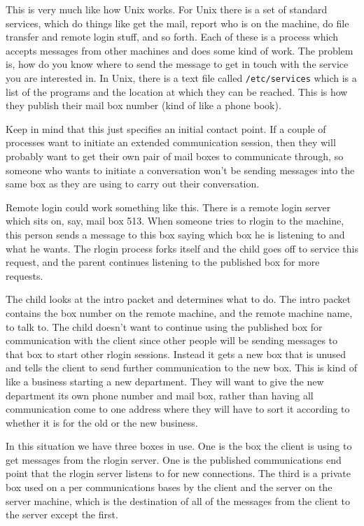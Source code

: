 This is very much like how Unix works.  For Unix there is a set of standard
services, which do things like get the mail, report who is on the machine,
do file transfer and remote login stuff, and so forth.  Each of these is
a process which accepts messages from other machines and does some kind of
work.  The problem is, how do you know where to send the message to get
in touch with the service you are interested in.  In Unix, there is a 
text file called {\tt /etc/services} which is a list of the programs and
the location at which they can be reached.  This is how they publish their
mail box number (kind of like a phone book).

Keep in mind that this just specifies an initial contact point.  If a couple
of processes want to initiate an extended communication session, then they
will probably want to get their own pair of mail boxes to communicate through,
so someone who wants to initiate a conversation won't be sending messages into
the same box as they are using to carry out their conversation.

Remote login could work something like this.  There is a remote login server
which sits on, say, mail box 513.  When someone tries to rlogin to the
machine, this person sends a message to this box saying which box he is
listening to and what he wants.  The rlogin process forks itself and the
child goes off to service this request, and the parent continues listening
to the published box for more requests.

The child looks at the intro packet and determines what to do.  The intro
packet contains the box number on the remote machine, and the remote machine
name, to talk to.
The child doesn't want to continue using the published box for communication
with the client since other people will be sending messages to that box to
start other rlogin sessions.  Instead it gets a new box that is unused and
tells the client to send further communication to the new box.  This
is kind of like a business starting a new department.  They will want to
give the new department its own phone number and mail box, rather than
having all communication come to one address where they will have to sort
it according to whether it is for the old or the new business.

In this situation we have three boxes in use.  One is the box the client is
using to get messages from the rlogin server.  One is the published 
communications end point that the rlogin server listens to for new
connections.  The third is a private box used on a per communications
bases by the client and the server on the server machine, which is the
destination of all of the messages from the client to the server except
the first.

